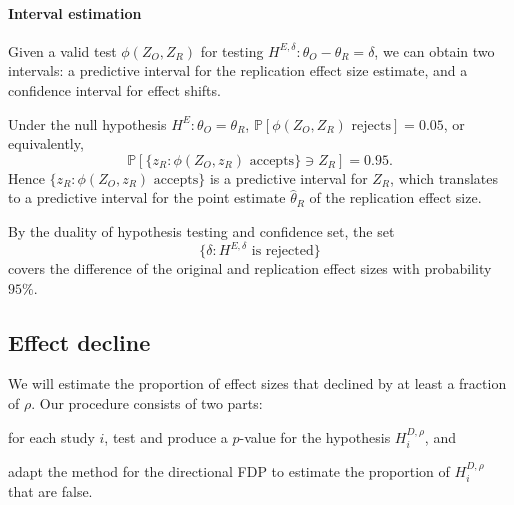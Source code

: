 \documentclass[11pt]{article}
\theoremstyle{definition}
\theoremstyle{custom}
\newcommand{\PP}{\mathbb{P}}
\newcommand{\htheta}{\hat{\theta}}
\begin{document}
  \paragraph{Interval estimation} Given a valid test $\phi(Z_O, Z_R)$ for testing $H^{E,\delta}: \theta_O - \theta_R = \delta$, we can obtain two intervals: a predictive interval for the replication effect size estimate, and a confidence interval for effect shifts.

  Under the null hypothesis $H^E: \theta_O = \theta_R$, $\PP[\phi(Z_O, Z_R) \text{ rejects}] = 0.05$, or equivalently,
  \[
    \PP[\{z_R: \phi(Z_O, z_R) \text{ accepts}\} \ni Z_R] = 0.95.
  \]
  Hence $\{z_R: \phi(Z_O, z_R) \text{ accepts}\}$ is a predictive interval for $Z_R$, which translates to a predictive interval for the point estimate $\htheta_R$ of the replication effect size.

  By the duality of hypothesis testing and confidence set, the set
  \[
    \{\delta: H^{E,\delta} \text{ is rejected}\}
  \]
  covers the difference of the original and replication effect sizes with probability $95\%$.

\subsection{Effect decline}

  We will estimate the proportion of effect sizes that declined by at least a fraction of $\rho$. Our procedure consists of two parts:
  \begin{inlinelist}
    \item for each study $i$, test and produce a $p$-value for the hypothesis $H_i^{D,\rho}$, and
    \item adapt the method for the directional FDP to estimate the proportion of $H_i^{D,\rho}$ that are false.
  \end{inlinelist}
\end{document}
